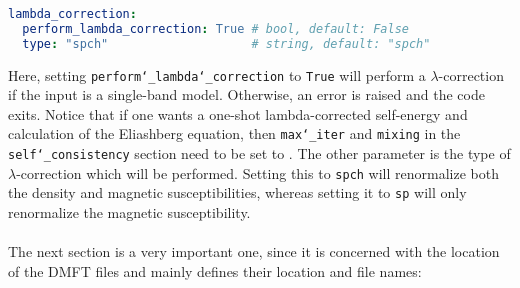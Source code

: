 \documentclass[\main/main.tex]{subfiles}
\begin{document}
\begin{minipage}{\textwidth}%
\begin{lstlisting}[language=yaml]
lambda_correction:
  perform_lambda_correction: True # bool, default: False
  type: "spch"                    # string, default: "spch"
\end{lstlisting}
\end{minipage}
Here, setting \texttt{perform\char`_lambda\char`_correction} to \texttt{True} will perform a $\lambda$-correction if the input is a single-band model. Otherwise, an error is raised and the code exits. Notice that if one wants a one-shot lambda-corrected self-energy and calculation of the Eliashberg equation, then \texttt{max\char`_iter} and \texttt{mixing} in the \texttt{self\char`_consistency} section need to be set to . The other parameter is the type of $\lambda$-correction which will be performed. Setting this to \texttt{spch} will renormalize both the density and magnetic susceptibilities, whereas setting it to \texttt{sp} will only renormalize the magnetic susceptibility.
\\\\
The next section is a very important one, since it is concerned with the location of the DMFT files and mainly defines their location and file names:
\end{document}
